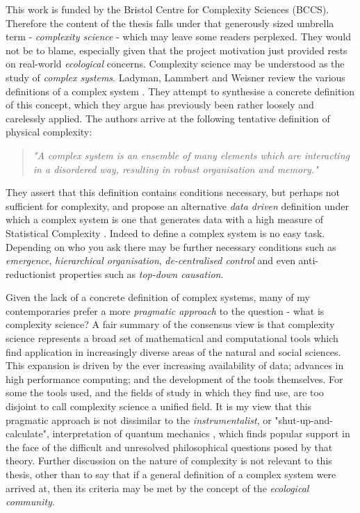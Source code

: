 This work is funded by the Bristol Centre for Complexity Sciences (BCCS). Therefore the content of the thesis falls under that generously sized umbrella term - \emph{complexity science} - which may leave some readers perplexed. They would not be to blame, especially given that the project motivation just provided rests on real-world \emph{ecological} concerns. Complexity science may be understood as the study of \emph{complex systems}. Ladyman, Lammbert and Weisner review the various definitions of a complex system \cite{ladyman2013complex}. They attempt to synthesise a concrete definition of this concept, which they argue has previously been rather loosely and carelessly applied. The authors arrive at the following tentative  definition of physical complexity:
\begin{quotation}
\emph{"A  complex  system  is  an  ensemble  of  many  elements which are interacting in a disordered way, resulting in robust organisation and memory."}
\end{quotation}
They assert that this definition contains conditions necessary, but perhaps not sufficient for complexity, and propose an alternative \emph{data driven} definition under which a complex system is one that generates data with a high measure of Statistical Complexity \cite{crutchfield1989inferring}. Indeed to define a complex system is no easy task. Depending on who you ask there may be further necessary conditions such as \emph{emergence}, \emph{hierarchical organisation}, \emph{de-centralised control} and even anti-reductionist properties such as \emph{top-down causation}. 

Given the lack of a concrete definition of complex systems, many of my contemporaries prefer a more \emph{pragmatic approach} to the question - what is complexity science? A fair summary of the consensus view is that complexity science represents a broad set of mathematical and computational tools which find application in increasingly diverse areas of the natural and social sciences. This expansion is driven by the ever increasing availability of data; advances in high performance computing; and the development of the tools themselves. For some the tools used, and the fields of study in which they find use, are too disjoint to call complexity science a unified field. It is my view that this pragmatic approach is not dissimilar to the \emph{instrumentalist}, or "shut-up-and-calculate", interpretation of quantum mechanics \cite{norris2002quantum}, which finds popular support in the face of the difficult and unresolved philosophical questions posed by that theory. Further discussion on the nature of complexity is not relevant to this thesis, other than to say that if a general definition of a complex system were arrived at, then its criteria may be met by the concept of the \emph{ecological community}.

